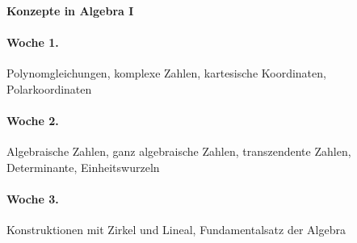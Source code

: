 \documentclass{../algblatt}
\begin{document}
\begin{center}\huge \textsf{\textbf{Konzepte in Algebra I}}\end{center}
\vspace{1em}


\paragraph{Woche 1.} Polynomgleichungen, komplexe Zahlen, kartesische
Koordinaten, Polarkoordinaten

\paragraph{Woche 2.} Algebraische Zahlen, ganz algebraische Zahlen,
transzendente Zahlen, Determinante, Einheitswurzeln

\paragraph{Woche 3.} Konstruktionen mit Zirkel und Lineal,
Fundamentalsatz der Algebra

\end{document}
